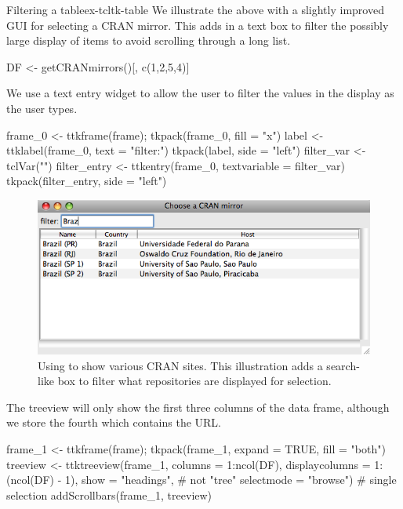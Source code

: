 \begin{example}{Filtering a table}{ex-tcltk-table}
%
We illustrate the above with a slightly improved GUI for selecting a CRAN mirror. This adds in a text box to filter the possibly large display of items to avoid scrolling through a long list. 
\begin{Schunk}
\begin{Sinput}
 DF <- getCRANmirrors()[, c(1,2,5,4)]
\end{Sinput}
\end{Schunk}


We use a text entry widget to allow the user to filter the values in the display as the user types.
\begin{Schunk}
\begin{Sinput}
 frame_0 <- ttkframe(frame); tkpack(frame_0, fill = "x")
 label <- ttklabel(frame_0, text = "filter:")
 tkpack(label, side = "left")
 filter_var <- tclVar("")
 filter_entry <- ttkentry(frame_0, textvariable = filter_var)
 tkpack(filter_entry, side = "left")
\end{Sinput}
\end{Schunk}

\begin{figure}
  \centering
  \includegraphics[width=.8\textwidth]{fig-tcltk-filter-table.png}
  \caption{Using  to show various CRAN sites. This
    illustration adds a search-like box to filter what repositories
    are displayed for selection.}
  \label{fig:fig-tcltk-filter-table}
\end{figure}


The treeview  will only show the first three columns of the data frame, although we store the fourth which contains the URL.
\begin{Schunk}
\begin{Sinput}
 frame_1 <- ttkframe(frame); tkpack(frame_1, expand = TRUE, fill = "both")
 treeview <- ttktreeview(frame_1, columns = 1:ncol(DF), 
                   displaycolumns = 1:(ncol(DF) - 1), 
                   show = "headings",     # not "tree" 
                   selectmode = "browse") # single selection
 addScrollbars(frame_1, treeview)
\end{Sinput}
\end{Schunk}


\end{example}
